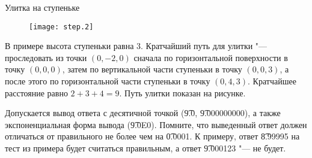 \begin{problem}{Улитка на ступеньке}
\Example

\begin{example}%
%
\end{example}

\Explanation

{

\begin{figure}
\texttt{[image: step.2]}
\end{figure}


В примере высота ступеньки равна $3$.
Кратчайший путь для улитки "--- проследовать из точки $(0, -2, 0)$
сначала по горизонтальной поверхности в точку $(0, 0, 0)$,
затем по вертикальной части ступеньки в точку $(0, 0, 3)$,
а после этого по горизонтальной части ступеньки в точку $(0, 4, 3)$.
Кратчайшее расстояние равно $2 + 3 + 4 = 9$.
Путь улитки показан на рисунке.

Допускается вывод ответа с десятичной точкой (\t{9.0}, \t{9.000000000}),
а также экспоненциальная форма вывода (\t{9.0E0}).
Помните, что выведенный ответ должен отличаться от правильного
не более чем на \t{0.0001}.
К примеру, ответ \t{8.99995} на тест из примера будет считаться правильным,
а ответ \t{9.000123} "--- не будет.

}

%

\end{problem}
